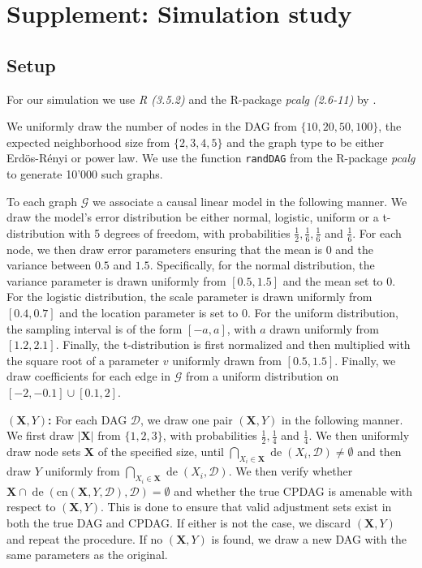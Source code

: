 \documentclass[11pt,a4paper]{article}
\theoremstyle{definition}
\theoremstyle{remark}
\DeclareMathOperator{\de}{de}
\newcommand{\g}[1][G]{\mathcal{#1}}
\begin{document}
\section{Supplement: Simulation study}


\subsection{Setup}
\label{setupMSE}

 For our simulation we use {\em R (3.5.2)} and the R-package {\em pcalg (2.6-11)} by \citet{Kalisch2012}.

 We uniformly draw the number of nodes in the DAG from $\{10,20,50,100\}$, the expected neighborhood size from $\{2,3,4,5\}$ and the graph type to be either Erd\"os-R\'enyi or power law. We use the function {\tt randDAG} from the R-package {\em pcalg} to generate 10'000 such graphs.

 To each graph $\g$ we associate a causal linear model in the following manner. We draw the model's error distribution be either normal, logistic, uniform or a t-distribution with 5 degrees of freedom, with probabilities $\frac{1}{2},\frac{1}{6},\frac{1}{6}$ and $\frac{1}{6}$. For each node, we then draw error parameters ensuring that the mean is 0 and the variance between $0.5$ and $1.5$. Specifically, for the normal distribution, the variance parameter is drawn uniformly from $[0.5,1.5]$ and the mean set to 0. For the logistic distribution, the scale parameter is drawn uniformly from $[0.4,0.7]$ and the location parameter is set to 0. For the uniform distribution, the sampling interval is of the form $[-a,a]$, with $a$ drawn uniformly from $[1.2,2.1]$. Finally, the t-distribution is first normalized and then multiplied with the square root of a parameter $v$ uniformly drawn from $[0.5,1.5]$. Finally, we draw coefficients for each edge in $\g$ from a uniform distribution on $[-2,-0.1] \cup [0.1,2]$. 


 $(\mathbf{X},Y)${\bf:} For each DAG $\g[D]$, we draw one pair $(\mathbf{X},Y)$ in the following manner. We first draw $|\mathbf{X}|$ from $\{1,2,3\}$, with probabilities $\frac{1}{2},\frac{1}{4}$ and $\frac{1}{4}$.  We then uniformly draw node sets $\mathbf{X}$ of the specified size, until $\bigcap_{X_i \in \mathbf{X}} \de(X_i,\g[D]) \neq \emptyset$ and then draw $Y$ uniformly from $\bigcap_{X_i \in \mathbf{X}} \de(X_i,\g[D])$. We then verify whether $\mathbf{X} \cap \de(\text{cn}(\mathbf{X},Y,\g[D]),\g[D]) = \emptyset$ and whether the true CPDAG is amenable with respect to $(\mathbf{X},Y)$.
This is done to ensure that valid adjustment sets exist in both the true DAG and CPDAG. If either is not the case, we discard $(\mathbf{X},Y)$ and repeat the procedure. If no $(\mathbf{X},Y)$ is found, we draw a new DAG with the same parameters as the original. 
\end{document}

